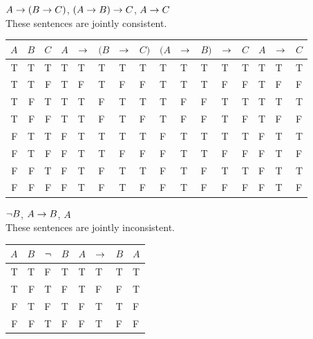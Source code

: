 \begin{earg}
\item $A \rightarrow (B \rightarrow C)$, $(A \rightarrow B) \rightarrow C$, $A \rightarrow C$\\
These sentences are jointly consistent.
\begin{flushleft}
\begin{tabular}{d d d | f e e e h | f e e e h | f e e}
$A$ & $B$ & $C$ & $A$ & $\rightarrow$ & $(B$ & $\rightarrow$ & $C)$ & $(A$ & $\rightarrow$ & $B)$ & $\rightarrow$ & $C$ & $A$ & $\rightarrow$ & $C$\\
\hline
T & T & T &    T & T &   T & T & T &          T & T & T &   T & T &     T & T & T\Tstrut\\
T & T & F &    T & F &   T & F & F &          T & T & T &   F & F &      T & F & F\\
T & F & T &    T & T &   F & T & T &          T & F & F &   T & T &      T & T & T\\
T & F & F &    T & T &   F & T & F &          T & F & F &   T & F &      T & F & F\\\hline
F & T & T &    F & T &   T & T & T &          F & T & T &   T & T &     F & T & T\Tstrut\\
F & T & F &    F & T &   T & F & F &          F & T & T &   F & F &      F & T & F\\
F & F & T &    F & T &   F & T & T &          F & T & F &   T & T &      F & T & T\\
F & F & F &    F & T &   F & T & F &          F & T & F  &  F & F  &     F & T & F 
\end{tabular}
\end{flushleft}\medskip

\item ${\neg} B$, $A \rightarrow B$, $A$\\
These sentences are jointly inconsistent.
\begin{flushleft}
\begin{tabular}{d d | f h | f e h | f}
$A$ & $B$ & ${\neg}$ & $B$ & $A$ & $\rightarrow$ & $B$ & $A$\\
\hline
T & T &  F & T &    T & T & T &   T\Tstrut\\ 
T & F &  T & F &    T & F & F &   T\\ 
F & T &  F & T &    F & T & T &   F\\ 
F & F &  T & F &    F & T & F &   F
\end{tabular}
\end{flushleft}\medskip


\end{earg}
